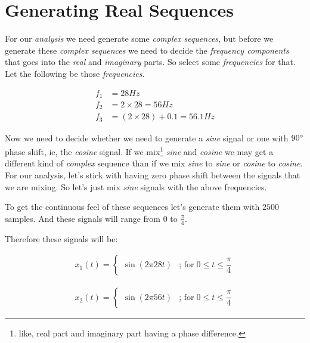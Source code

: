 \documentclass[../../course]{subfiles}
\begin{document}
\def\freqXOne{28}
\def\freqXTwo{56}
\def\freqXThree{56.1}

\section{Generating Real Sequences} \label{sec:wrkGenSeqs}

For our \emph{analysis} we need generate some \emph{complex sequences}, but before
we generate these \emph{complex sequences} we need to decide the \emph{frequency
components} that goes into the \emph{real} and \emph{imaginary} parts. So
select some \emph{frequencies} for that. Let the following be those \emph{frequencies}.

\begin{align}
    f_{1} &= \freqXOne \si{Hz}                                  \label{eqn:freq1} \\
    f_{2} &= 2 \times \freqXOne         = \freqXTwo   \si{Hz}   \label{eqn:freq2} \\
    f_{3} &= (2 \times \freqXOne) + 0.1 = \freqXThree \si{Hz}   \label{eqn:freq3}
\end{align}

Now we need to decide whether we need to generate a \emph{sine} signal or one with
$90 \degree$ phase shift, ie, the \emph{cosine} signal. If we mix\footnote{like, real
part and imaginary part having a phase difference.} \emph{sine} and \emph{cosine} we may
get a different kind of \emph{complex} sequence than if we mix \emph{sine} to \emph{sine}
or \emph{cosine} to \emph{cosine}. For our analysis, let's stick with having zero phase
shift between the signals that we are mixing. So let's just mix \emph{sine} signals with
the above frequencies.


To get the continuous feel of these sequences let's generate them with $2500$ samples.
And these signals will range from $0$ to $\frac{\pi}{4}$.


Therefore these signals will be:

\begin{align}
    x_{1}(t) =
    \begin{cases}
        \sin(2 \pi \freqXOne t) & \text{; for} \; 0 \le t \le \dfrac{\pi}{4}
    \end{cases}
    \label{eqn:seqx1}
\end{align}

\begin{align}
    x_{2}(t) =
    \begin{cases}
        \sin(2 \pi \freqXTwo t) & \text{; for} \; 0 \le t \le \dfrac{\pi}{4}
    \end{cases}
    \label{eqn:seqx2}
\end{align}
\end{document}
